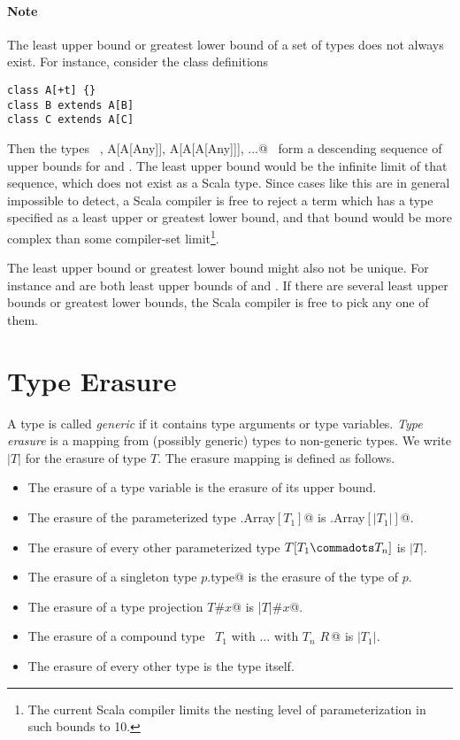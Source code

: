 \paragraph{Note} The least upper bound or greatest lower bound 
of a set of types does not always exist. For instance, consider
the class definitions
\begin{lstlisting}
class A[+t] {}
class B extends A[B] 
class C extends A[C] 
\end{lstlisting}
Then the types ~\lstinline@A[Any], A[A[Any]], A[A[A[Any]]], ...@~ form
a descending sequence of upper bounds for  and . The
least upper bound would be the infinite limit of that sequence, which
does not exist as a Scala type. Since cases like this are in general
impossible to detect, a Scala compiler is free to reject a term
which has a type specified as a least upper or greatest lower bound,
and that bound would be more complex than some compiler-set
limit\footnote{The current Scala compiler limits the nesting level
of parameterization in such bounds to 10.}.

The least upper bound or greatest lower bound might also not be
unique. For instance  and  are both
least upper bounds of  and . If there are several
least upper bounds or greatest lower bounds, the Scala compiler is
free to pick any one of them.

\section{Type Erasure}
\label{sec:erasure}

A type is called {\em generic} if it contains type arguments or type variables.
{\em Type erasure} is a mapping from (possibly generic) types to
non-generic types. We write $|T|$ for the erasure of type $T$.
The erasure mapping is defined as follows.
\begin{itemize}
\item The erasure of a type variable is the erasure of its upper bound.
\item The erasure of the parameterized type \lstinline@scala.Array$[T_1]$@ is
 \lstinline@scala.Array$[|T_1|]$@.
 \item The erasure of every other parameterized type $T[T_1 \commadots T_n]$ is $|T|$.
\item The erasure of a singleton type \lstinline@$p$.type@ is the 
      erasure of the type of $p$.
\item The erasure of a type projection \lstinline@$T$#$x$@ is \lstinline@|$T$|#$x$@.
\item The erasure of a compound type ~\lstinline@$T_1$ with $\ldots$ with $T_n$ {$R\,$}@ 
      is $|T_1|$.
\item The erasure of every other type is the type itself.
\end{itemize}

